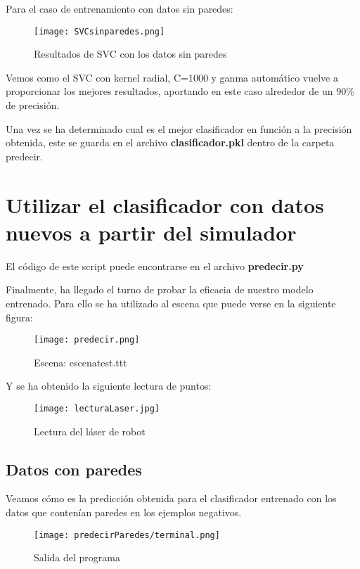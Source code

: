 Para el caso de entrenamiento con datos sin paredes:

\begin{figure}[H]
	\centering
	\texttt{[image: SVCsinparedes.png]}
	\caption{Resultados de SVC con los datos sin paredes}
\end{figure}

Vemos como el SVC con kernel radial, C=1000 y ganma automático vuelve a proporcionar los mejores resultados, aportando en este caso alrededor de un 90\% de precisión.

Una vez se ha determinado cual es el mejor clasificador en función a la precisión obtenida, este se guarda en el archivo \textbf{clasificador.pkl} dentro de la carpeta predecir.

\newpage

\section{Utilizar el clasificador con datos nuevos a partir del simulador}

El código de este script puede encontrarse en el archivo \textbf{predecir.py}

Finalmente, ha llegado el turno de probar la eficacia de nuestro modelo entrenado. Para ello se ha utilizado al escena que puede verse en la siguiente figura:
\begin{figure}[H]
	\centering
	\texttt{[image: predecir.png]}
	\caption{Escena: escenatest.ttt}
\end{figure}

Y se ha obtenido la siguiente lectura de puntos:

\begin{figure}[H]
	\centering
	\texttt{[image: lecturaLaser.jpg]}
	\caption{Lectura del láser de robot}
\end{figure}

\subsection{Datos con paredes}
Veamos cómo es la predicción obtenida para el clasificador entrenado con los datos que contenían paredes en los ejemplos negativos.

\begin{figure}[H]
	\centering
	\texttt{[image: predecirParedes/terminal.png]}
	\caption{Salida del programa}
\end{figure}

